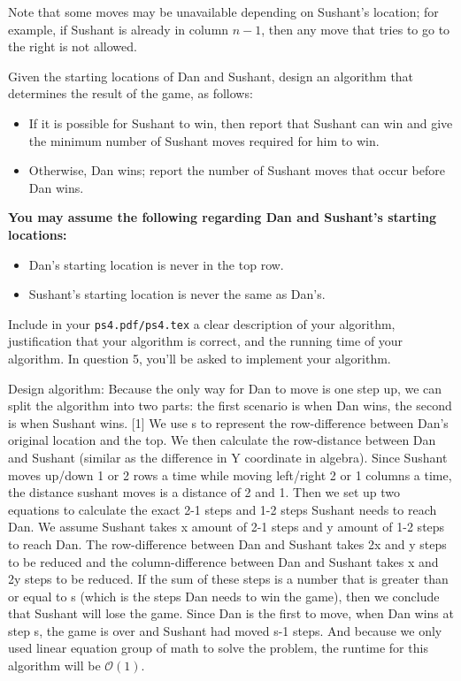 \documentclass{assignment-263}
\begin{document}
\begin{enumerate}
		Note that some moves may be unavailable depending on Sushant's
		location; for example, if Sushant is already in column $n-1$, then any
		move that tries to go to the right is not allowed.

		Given the starting locations of Dan and Sushant, design an algorithm
		that determines the result of the game, as follows:
		\begin{itemize}
			\item If it is possible for Sushant to win, then report that Sushant
				can win and give the minimum number of Sushant moves required
				for him to win.
			\item Otherwise, Dan wins; report the number of Sushant moves that
				occur before Dan wins.
		\end{itemize}

		\textbf{You may assume the following regarding Dan and Sushant's
		starting locations:}
		\begin{itemize}
			\item Dan's starting location is never in the top row.
			\item Sushant's starting location is never the same as Dan's.
		\end{itemize}

		Include in your \verb|ps4.pdf/ps4.tex| a clear description of your
		algorithm, justification that your algorithm is correct, and the
		running time of your algorithm.
		In question 5, you'll be asked to implement your algorithm.

\end{enumerate}
Design algorithm:\vskip5pt
Because the only way for Dan to move is one step up, we can split the algorithm into two parts: the first scenario is when Dan wins, the second is when Sushant wins. \vskip5pt
[1] We use s to represent the row-difference between Dan’s original location and the top. We then calculate the row-distance between Dan and Sushant (similar as the difference in Y coordinate in algebra). Since Sushant moves up/down 1 or 2 rows a time while moving left/right 2 or 1 columns a time, the distance sushant moves is a distance of 2 and 1. Then we set up two equations to calculate the exact 2-1 steps and 1-2 steps Sushant needs to reach Dan. We assume Sushant takes x amount of 2-1 steps and y amount of 1-2 steps to reach Dan. The row-difference between Dan and Sushant takes 2x and y steps to be reduced and the column-difference between Dan and Sushant takes x and 2y steps to be reduced. If the sum of these steps is a number that is greater than or equal to s (which is the steps Dan needs to win the game), then we conclude that Sushant will lose the game. Since Dan is the first to move, when Dan wins at step s, the game is over and Sushant had moved s-1 steps. And because we only used linear equation group of math to solve the problem, the runtime for this algorithm will be $\mathcal{O}(1)$.\vskip5pt
\end{document}
